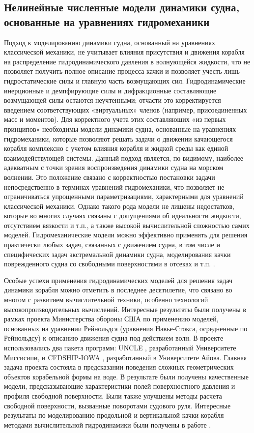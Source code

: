 \subsection{Нелинейные численные модели динамики судна, основанные на уравнениях гидромеханики}
Подход к моделированию динамики судна, основанный на уравнениях классической механики, не учитывает влияния присутствия и движения корабля на распределение гидродинамического давления в волнующейся жидкости, что не позволяет получить полное описание процесса качки и позволяет учесть лишь гидростатические силы и главную часть возмущающих сил. Гидродинамические инерционные и демпфирующие силы и дифракционные составляющие возмущающей силы остаются неучтенными; отчасти это корректируется введением соответствующих «виртуальных» членов (например, присоединенных масс и моментов). Для корректного учета этих составляющих «из первых принципов» необходимы модели динамики судна, основанные на уравнениях гидромеханики, которые позволяют решать задачи о движении качающегося корабля комплексно с учетом влияния корабля и жидкой среды как единой взаимодействующей системы. Данный подход является, по-видимому, наиболее адекватным с точки зрения воспроизведения динамики судна на морском волнении. Это положение связано с корректностью постановки задачи непосредственно в терминах уравнений гидромеханики, что позволяет не ограничиваться упрощенными параметризациями, характерными для уравнений классической механики. Однако такого рода модели не лишены недостатков, которые во многих случаях связаны с допущениями об идеальности жидкости, отсутствием вязкости и т.п., а также высокой вычислительной сложностью самих моделей. Гидромеханические модели можно эффективно применять для решения практически любых задач, связанных с движением судна, в том числе и специфических задач экстремальной динамики судна, моделирования качки поврежденного судна со свободными поверхностями в отсеках и т.п. \citep{dk33}\citep{dk34}.

Особые успехи применения гидродинамических моделей для решения задач динамики корабля можно отметить в последнее десятилетие, что связано во многом с развитием вычислительной техники, особенно технологий высокопроизводительных вычислений. Интересные результаты были получены в рамках проекта Министерства обороны США \citep{dk35} по применению моделей, основанных на уравнении Рейнольдса (уравнения Навье-Стокса, осредненные по Рейнольдсу) к описанию движения судна под действием волн. В проекте использовались два пакета программ: UNCLE \citep{dk36}, разработанный Университете Миссисипи, и CFDSHIP-IOWA \citep{dk37}, разработанный в Университете Айова. Главная задача проекта состояла в предсказании поведения сложных геометрических объектов корабельной формы на воде. В результате были получены качественные модели, предсказывающие характеристики полей поверхностного давления и профиля свободной поверхности. Были также улучшены методы расчета свободной поверхности, вызванные поворотами судового руля. Интересные результаты по моделированию продольной и вертикальной качки корабля методами вычислительной гидродинамики были получены в работе \citep{dk38}.


